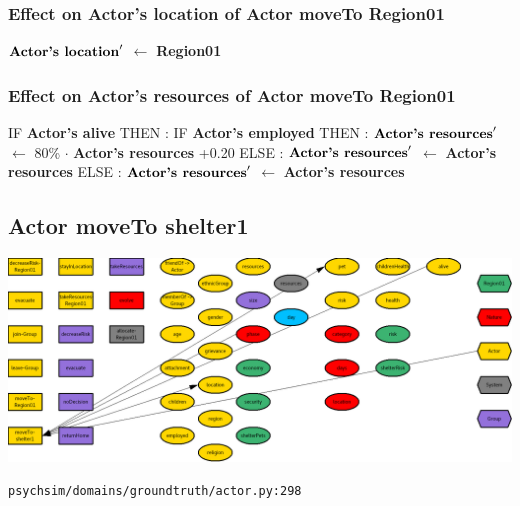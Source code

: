 \documentclass{article}%
\begin{document}
%
\subsubsection{Effect on Actor's location of Actor moveTo Region01}%
\label{ssubsec:Effect on Actor's location of Actor moveTo Region01}%
\begin{flushleft}%
$\mbox{\textbf{Actor's location}} '$%
$\leftarrow$%
\textbf{Region01}%
\end{flushleft}

%
\subsubsection{Effect on Actor's resources of Actor moveTo Region01}%
\label{ssubsec:Effect on Actor's resources of Actor moveTo Region01}%
\begin{flushleft}%
IF %
\textbf{Actor's alive}%
\linebreak%
\hspace*{2em}%
THEN %
: %
IF %
\textbf{Actor's employed}%
\linebreak%
\hspace*{4em}%
THEN %
: %
$\mbox{\textbf{Actor's resources}} '$%
$\leftarrow$%
80\%%
$\cdot$%
\textbf{Actor's resources}%
+0.20%
\linebreak%
\hspace*{4em}%
ELSE %
: %
$\mbox{\textbf{Actor's resources}} '$%
$\leftarrow$%
\textbf{Actor's resources}%
\linebreak%
\hspace*{2em}%
ELSE %
: %
$\mbox{\textbf{Actor's resources}} '$%
$\leftarrow$%
\textbf{Actor's resources}%
\end{flushleft}

%
\subsection{Actor moveTo shelter1}%
\label{subsec:Actor moveTo shelter1}%
\includegraphics[width=\textwidth]{images/Actor-moveTo-shelter1.png}%
\begin{flushleft}%
\verb|psychsim/domains/groundtruth/actor.py:298|%
\end{flushleft}%
\end{document}
